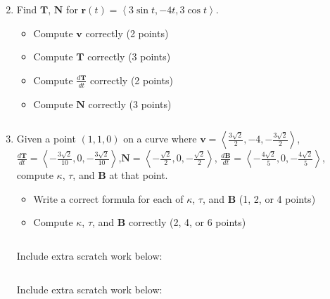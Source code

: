 \documentclass[12pt]{article}
\newcommand{\up}{$~$\vspace*{-0.7in}}
\newcommand{\liner}{\noindent\underline{\hspace*{7in}}}
\renewcommand{\vec}{\mathbf}
\newcommand{\<}{\left<}
\renewcommand{\>}{\right>}
\begin{document}
\begin{enumerate}
\vspace*{7in}

\liner
\newpage\up


\item Find $\vec{T}$, $\vec{N}$ for $\vec{r}(t) = \left< 3\sin t, -4t, 3\cos t \right>$.

  \begin{itemize}
    \item Compute $\vec{v}$ correctly (2 points)
    \item Compute $\vec{T}$ correctly (3 points)
    \item Compute $\frac{d\vec{T}}{dt}$ correctly (2 points)
    \item Compute $\vec{N}$ correctly (3 points)
  \end{itemize}

\vspace*{8in}

\liner
\newpage\up


\item Given a point $(1,1,0)$ on a curve where $\vec{v}=\left< \frac{3\sqrt{2}}{2}, -4, -\frac{3\sqrt{2}}{2}\right>$, $\frac{d\vec{T}}{dt}=\left<-\frac{3\sqrt{2}}{10},0,-\frac{3\sqrt{2}}{10}\right>$,\newline $\vec{N}=\left<-\frac{\sqrt{2}}{2},0,-\frac{\sqrt{2}}{2}\right>$, $\frac{d\vec{B}}{dt}=\left<-\frac{4\sqrt{2}}{5},0,-\frac{4\sqrt{2}}{5}\right>$, compute $\kappa$, $\tau$, and $\vec{B}$ at that point.

  \begin{itemize}
    \item Write a correct formula for each of $\kappa$, $\tau$, and $\vec{B}$ (1, 2, or 4 points)
    \item Compute $\kappa$, $\tau$, and $\vec{B}$ correctly (2, 4, or 6 points)
  \end{itemize}

\vspace*{8in}

\liner

\newpage\up

%
%

\centerline{Include extra scratch work below:}
\liner
\newpage\up

\centerline{Include extra scratch work below:}
\liner

\end{enumerate}
\end{document}
